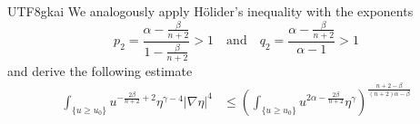 \documentclass[reqno,12pt]{amsart}
\newcommand{\text}{\mbox}
\numberwithin{equation}{section}
\begin{document}
\begin{CJK}{UTF8}{gkai}
   	  We analogously apply H\"{o}lider's inequality with the exponents
   	  $$ p_{2}=\frac{\alpha-\frac{\beta}{n+2}}{1-\frac{\beta}{n+2}}>1 \quad
   	  \text{and}\quad q_{2}=\frac{\alpha-\frac{\beta}{n+2}}{\alpha-1}>1 $$
   	  and derive the following estimate
   	  \begin{equation}\label{estimate for large}
   	  	\begin{aligned}
   	  		\int_{\{u\ge u_{0}\}} u^{-\frac{2\beta}{n+2}+2} \eta^{\gamma-4} |\nabla\eta|^{4}
   	  		&\le \left( \int_{\{u\ge u_{0}\}} u^{2\alpha-\frac{2\beta}{n+2}} \eta^{\gamma} \right)^{\frac{n+2-\beta}{(n+2)\alpha-\beta}} \\

\end{aligned}
\end{equation}
\end{CJK}
\end{document}
